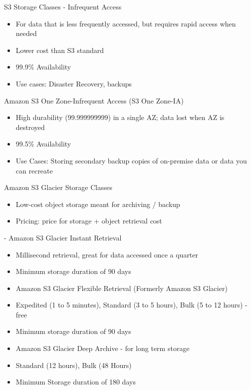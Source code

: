 \begin{itemize}
    S3 Storage Classes - Infrequent Access
    \begin{itemize}
        \item For data that is less frequently accessed, but requires rapid access when needed
        \item Lower cost than S3 standard
    \end{itemize}


    \begin{itemize}
        Amazon S3 Standard-Infrequent Access (S3 Standard-IA)
        \item 99.9\% Availability
        \item Use cases: Disaster Recovery, backups
    \end{itemize}

    Amazon S3 One Zone-Infrequent Access (S3 One Zone-IA)
    \begin{itemize}
        \item High durability (99.999999999) in a single AZ; data lost when AZ is destroyed
        \item 99.5\% Availability
        \item Use Cases: Storing secondary backup copies of on-premise data or data you can recreate
    \end{itemize}

    Amazon S3 Glacier Storage Classes
    \begin{itemize}
        \item Low-cost object storage meant for archiving / backup
        \item Pricing: price for storage + object retrieval cost
    \end{itemize}

    - Amazon S3 Glacier Instant Retrieval
    \begin{itemize}
        \item Millisecond retrieval, great for data accessed once a quarter
        \item Minimum storage duration of 90 days
        \item Amazon S3 Glacier Flexible Retrieval (Formerly Amazon S3 Glacier)
        \item Expedited (1 to 5 minutes), Standard (3 to 5 hours), Bulk (5 to 12 hours) - free
        \item Minimum storage duration of 90 days
        \item Amazon S3 Glacier Deep Archive - for long term storage
        \item Standard (12 hours), Bulk (48 Hours)
        \item Minimum Storage duration of 180 days
    \end{itemize}
\end{itemize}

